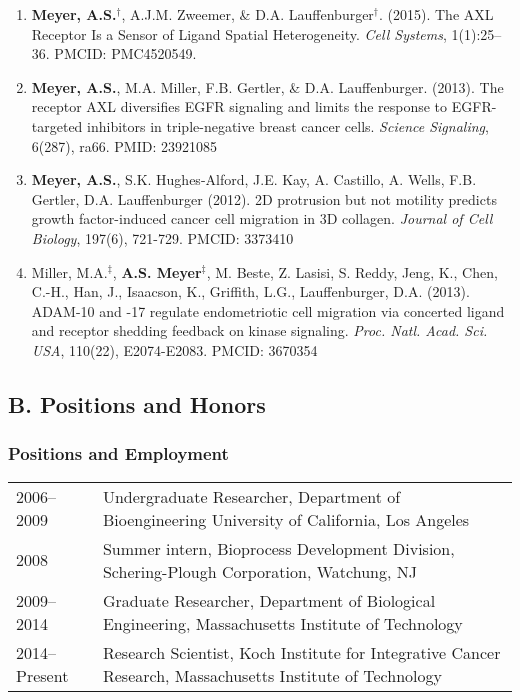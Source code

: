 \documentclass[12pt]{article}
\begin{document}
\begin{enumerate}
  \item \textbf{Meyer, A.S.}$^\dag$, A.J.M. Zweemer, \& D.A. Lauffenburger$^\dag$. (2015). The AXL Receptor Is a Sensor of Ligand Spatial Heterogeneity. \emph{Cell Systems}, 1(1):25--36. PMCID: PMC4520549.
  \item \textbf{Meyer, A.S.}, M.A. Miller, F.B. Gertler, \& D.A. Lauffenburger. (2013). The receptor AXL diversifies EGFR signaling and limits the response to EGFR-targeted inhibitors in triple-negative breast cancer cells. \emph{Science Signaling}, 6(287), ra66. PMID: 23921085
  \item \textbf{Meyer, A.S.}, S.K. Hughes-Alford, J.E. Kay, A. Castillo, A. Wells, F.B. Gertler, D.A. Lauffenburger (2012). 2D protrusion but not motility predicts growth factor-induced cancer cell migration in 3D collagen. \emph{Journal of Cell Biology}, 197(6), 721-729. PMCID: 3373410
  \item Miller, M.A.$^\ddag$, \textbf{A.S. Meyer}$^\ddag$, M. Beste, Z. Lasisi, S. Reddy, Jeng, K., Chen, C.-H., Han, J., Isaacson, K., Griffith, L.G., Lauffenburger, D.A. (2013). ADAM-10 and -17 regulate endometriotic cell migration via concerted ligand and receptor shedding feedback on kinase signaling. \emph{Proc. Natl. Acad. Sci. USA}, 110(22), E2074-E2083. PMCID: 3670354
\end{enumerate}





\subsection{B. Positions and Honors}

\subsubsection{Positions and Employment}

\begin{tabular}{p{1.1in}p{6.1in}}
  2006--2009 & Undergraduate Researcher, Department of Bioengineering
		University of California, Los Angeles\\
  2008 & Summer intern, Bioprocess Development Division, Schering-Plough Corporation, Watchung, NJ \\
  2009--2014 & Graduate Researcher, Department of Biological Engineering, Massachusetts Institute of Technology \\
  2014--Present & Research Scientist, Koch Institute for Integrative Cancer Research, Massachusetts Institute of Technology
\end{tabular}
\end{document}
